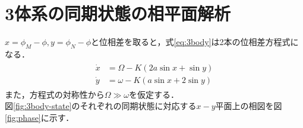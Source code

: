 \documentclass[../main]{subfiles}
\begin{document}
\section{3体系の同期状態の相平面解析}
$x=\phi_M-\phi,y=\phi_N-\phi$と位相差を取ると，式\eqref{eq:3body}は2本の位相差方程式になる．
\begin{align}
    \label{eq:phase-diff}
    \begin{split}
    \dot{x}&=\Omega-K(2a\sin x+\sin y)\\
    \dot{y}&=\omega-K(a\sin x+2\sin y)
    \end{split}
\end{align}
また，方程式の対称性から$\Omega\gg\omega$を仮定する．\\
図\eqref{fig:3body-state}のそれぞれの同期状態に対応する$x-y$平面上の相図を図\ref{fig:phase}に示す．
\end{document}
